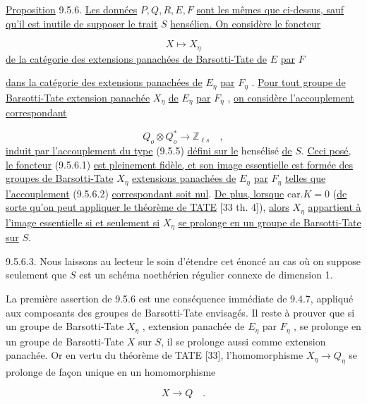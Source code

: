 \underline{Proposition} 9.5.6. \underline{Les données} $P,Q,R,E,F$ \underline{sont les mêmes que ci-dessus, sauf qu'il est inutile de supposer le trait} $S$ \underline{hensélien. On considère le foncteur}

\begin{equation}\tag{9.5.6.1}
X \longmapsto X_\eta
\end{equation}
\underline{de la catégorie des extensions panachées de Barsotti-Tate de} $E$ \underline{par} $F$



\underline{dans la catégorie des extensions panachées de} $E_\eta$ \underline{par} $F_\eta$ . \underline{Pour tout groupe de Barsotti-Tate extension panachée} $X_\eta$ \underline{de} $E_\eta$ \underline{par} $F_\eta$ , \underline{on considère l'accouplement correspondant}

\begin{equation}\tag{9.5.6.2}
Q_o \otimes Q^*_o \longrightarrow \mathbb{Z}_{\ell s} \quad ,
\end{equation}
\underline{induit par l'accouplement du type} (9.5.5) \underline{défini sur le} hensélisé \underline{de} $S$. \underline{Ceci posé, le foncteur} (9.5.6.1) \underline{est pleinement fidèle, et son image essentielle est formée des groupes de Barsotti-Tate} $X_\eta$ \underline{extensions panachées de} $E_\eta$ \underline{par} $F_\eta$ \underline{telles que l'accouplement} (9.5.6.2) \underline{correspondant soit nul}. \underline{De plus, lorsque} car.$K = 0$ (\underline{de sorte qu'on peut appliquer le théorème de TATE} [33 th. 4]), \underline{alors} $X_\eta$ \underline{appartient à l'image essentielle si et seulement si} $X_\eta$ \underline{se prolonge en un groupe de Barsotti-Tate sur} $S$.

9.5.6.3. Nous laissons au lecteur le soin d'étendre cet énoncé au cas où on suppose seulement que $S$ est un schéma noethérien régulier connexe de dimension 1.

La première assertion de 9.5.6 est une conséquence immédiate de 9.4.7, appliqué aux composants des groupes de Barsotti-Tate envisagés. Il reste à prouver que si un groupe de Barsotti-Tate $X_\eta$ , extension panachée de $E_\eta$ par $F_\eta$ , se prolonge en un groupe de Barsotti-Tate $X$ sur $S$, il se prolonge aussi comme extension panachée. Or en vertu du théorème de TATE [33], l'homomorphisme $X_\eta \longrightarrow Q_\eta$ se prolonge de façon unique en un homomorphisme

\begin{equation*}
X \longrightarrow Q \quad .
\end{equation*}


